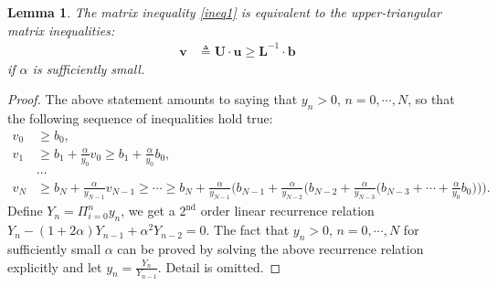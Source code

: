 \documentclass[paper=a4, fontsize=10pt,]{scrartcl} %
\newtheorem{lemma}[theorem]{Lemma}
\theoremstyle{theorem}
\theoremstyle{remark}
\theoremstyle{example}
\numberwithin{equation}{section} %
\numberwithin{figure}{section} %
\numberwithin{table}{section} %
\begin{document}
\begin{lemma}
The matrix inequality \ref{ineq1} is equivalent to the upper-triangular matrix inequalities:
\begin{align}\label{ineq2}
\mathbf{v} &\triangleq \mathbf{U}\cdot\mathbf{u} \ge \mathbf{L}^{-1}\cdot\mathbf{b}
\end{align}
if $\alpha$ is sufficiently small.
\end{lemma}
\begin{proof}
The above statement amounts to saying that $y_n>0$, $n=0,\cdots,N$, so that the following sequence
of inequalities hold true:
\begin{align*}
v_0 &\ge b_0,\\
v_1 &\ge b_1 + \frac{\alpha}{y_0}v_0 \ge b_1 + \frac{\alpha}{y_0}b_0,\\
&\cdots \\
v_N &\ge b_N + \frac{\alpha}{y_{N-1}}v_{N-1} \ge \cdots \ge b_N + \frac{\alpha}{y_{N-1}}\Big(b_{N-1} + \frac{\alpha}{y_{N-2}}\Big( 
b_{N-2} + \frac{\alpha}{y_{N-3}}\Big(b_{N-3}+\cdots + \frac{\alpha}{y_{0}}b_0 \Big)\Big)\Big).
\end{align*}
Define $Y_n = \Pi_{i=0}^n y_n$, we get a $2^{\text{nd}}$ order linear recurrence relation $Y_n - (1+2\alpha)Y_{n-1} +\alpha^2 Y_{n-2}=0$. 
The fact that $y_n>0$, $n=0,\cdots,N$ for sufficiently small $\alpha$ can be proved by solving the above recurrence relation 
explicitly and let $y_n = \frac{Y_n}{Y_{n-1}}$. Detail is omitted.
\end{proof}
\end{document}
